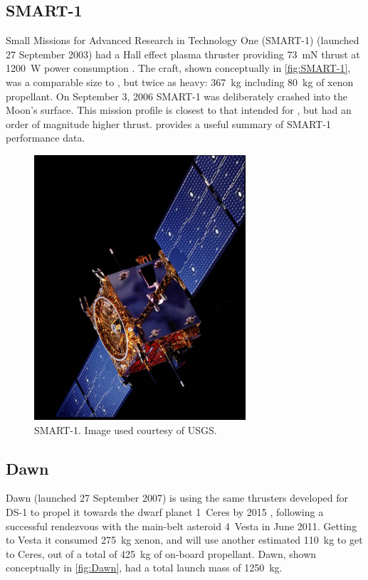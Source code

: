 \subsection{SMART-1}
Small Missions for Advanced Research in Technology One (SMART-1) (launched 27 September 2003) had a Hall effect plasma thruster providing 73~mN thrust at 1200~W power consumption \parencite{web_SMART-1}. The craft, shown conceptually in \autoref{fig:SMART-1}, was a comparable size to \BW, but twice as heavy: 367~kg including 80~kg of xenon propellant. On September 3, 2006 SMART-1 was deliberately crashed into the Moon's surface. This mission profile is closest to that intended for \BW, but had an order of magnitude higher thrust. \textcite{Estublier2007} provides a useful summary of SMART-1 performance data.

\begin{figure}[ht]
\centering
\includegraphics [angle=90,width=0.7\textwidth] {Images/SMART-1.jpg}
\caption{SMART-1. Image used courtesy of USGS.}
\label{fig:SMART-1}
\end{figure}

\subsection{Dawn}
Dawn (launched 27 September 2007) is using the same thrusters developed for DS-1 to propel it towards the dwarf planet 1~Ceres by 2015 \parencite{web_Dawn}, following a successful rendezvous with the main-belt asteroid 4~Vesta in June 2011. Getting to Vesta it consumed 275~kg xenon, and will use another estimated 110~kg to get to Ceres, out of a total of 425~kg of on-board propellant. Dawn, shown conceptually in \autoref{fig:Dawn}, had a total launch mass of 1250~kg.

